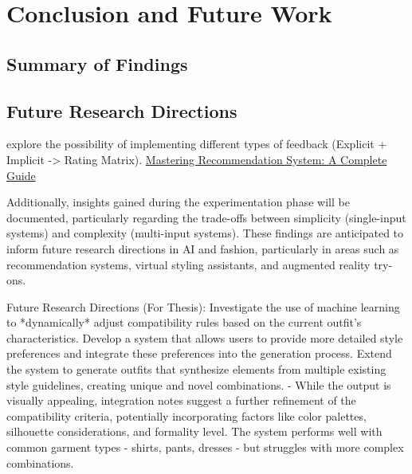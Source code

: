 \chapter{Conclusion and Future Work}
\section{Summary of Findings}
\section{Future Research Directions}


explore the possibility of implementing different types of feedback (Explicit + Implicit -> Rating Matrix). \href{https://learnopencv.com/recommendation-system/}{Mastering Recommendation System: A Complete Guide}

Additionally, insights gained during the experimentation phase will be documented, particularly regarding the trade-offs between simplicity (single-input systems) and complexity (multi-input systems). These findings are anticipated to inform future research directions in \acs{AI} and fashion, particularly in areas such as recommendation systems, virtual styling assistants, and augmented reality try-ons.

Future Research Directions (For Thesis): Investigate the use of machine learning to *dynamically* adjust compatibility rules based on the current outfit's characteristics. Develop a system that allows users to provide more detailed style preferences and integrate these preferences into the generation process. Extend the system to generate outfits that synthesize elements from multiple existing style guidelines, creating unique and novel combinations. - While the output is visually appealing, integration notes suggest a further refinement of the compatibility criteria, potentially incorporating factors like color palettes, silhouette considerations, and formality level.  The system performs well with common garment types - shirts, pants, dresses - but struggles with more complex combinations.
